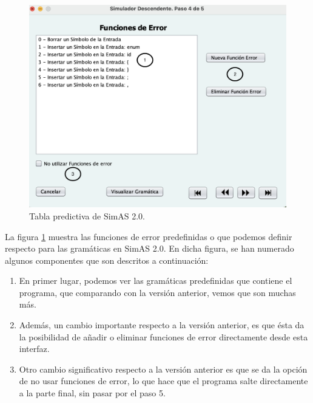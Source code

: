  \begin{figure}[htp]
 	\begin{center}
      \includegraphics[scale=0.5]{figuras/Cap3/SimAS2/paso4.png} 
       \caption{Tabla predictiva de SimAS 2.0.}\label{fig:SimAS-2.0-paso4}
 	\end{center}
\end{figure}

La figura \ref{fig:SimAS-2.0-paso4} muestra las funciones de error predefinidas o que podemos definir respecto para las gramáticas en SimAS 2.0. En dicha figura, se han numerado algunos componentes que son descritos a continuación:
 \begin{enumerate}
     \item En primer lugar, podemos ver las gramáticas predefinidas que contiene el programa, que comparando con la versión anterior, vemos que son muchas más.
     \item Además, un cambio importante respecto a la versión anterior, es que ésta da la posibilidad de añadir o eliminar funciones de error directamente desde esta interfaz.
     \item Otro cambio significativo respecto a la versión anterior es que se da la opción de no usar funciones de error, lo que hace que el programa salte directamente a la parte final, sin pasar por el paso 5.
 \end{enumerate}

